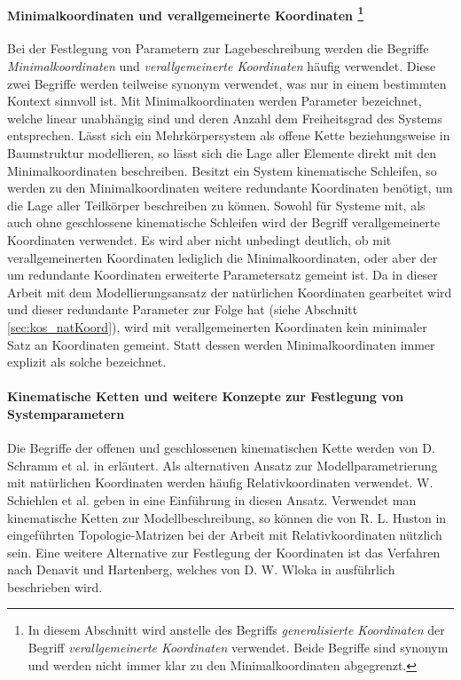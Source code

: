   \paragraph{Minimalkoordinaten und verallgemeinerte Koordinaten \footnote{In diesem Abschnitt wird anstelle des Begriffs \textit{generalisierte Koordinaten} der Begriff \textit{verallgemeinerte Koordinaten} verwendet. Beide Begriffe sind synonym und werden nicht immer klar zu den Minimalkoordinaten abgegrenzt.}}
  Bei der Festlegung von Parametern zur Lagebeschreibung werden die Begriffe \textit{Minimalkoordinaten} und \textit{verallgemeinerte Koordinaten} h\"aufig verwendet. Diese zwei Begriffe werden teilweise synonym verwendet, was nur in einem bestimmten Kontext sinnvoll ist. \hfill \newline
  Mit Minimalkoordinaten werden Parameter bezeichnet, welche linear unabh\"angig sind und deren Anzahl dem Freiheitsgrad des Systems entsprechen. L\"asst sich ein Mehrk\"orpersystem als offene Kette beziehungsweise in Baumstruktur modellieren, so l\"asst sich die Lage aller Elemente direkt mit den Minimalkoordinaten beschreiben. \cite[S.27 f.]{Bestle2012} Besitzt ein System kinematische Schleifen, so werden zu den Minimalkoordinaten weitere redundante Koordinaten ben\"otigt, um die Lage aller Teilk\"orper beschreiben zu k\"onnen. \cite[S.63]{Schramm2010} Sowohl f\"ur Systeme mit, als auch ohne geschlossene kinematische Schleifen wird der Begriff verallgemeinerte Koordinaten verwendet.  Es wird aber nicht unbedingt deutlich, ob mit verallgemeinerten Koordinaten lediglich die Minimalkoordinaten, oder aber der um redundante Koordinaten erweiterte Parametersatz gemeint ist. \cite[S.133]{Woernle2011} Da in dieser Arbeit mit dem Modellierungsansatz der nat\"urlichen Koordinaten gearbeitet wird und dieser redundante Parameter zur Folge hat (siehe Abschnitt \ref{sec:kos_natKoord}), wird mit verallgemeinerten Koordinaten kein minimaler Satz an Koordinaten gemeint. Statt dessen werden Minimalkoordinaten immer explizit als solche bezeichnet.
  \paragraph*{Kinematische Ketten und weitere Konzepte zur Festlegung von Systemparametern}
  Die Begriffe der offenen und geschlossenen kinematischen Kette werden von D. Schramm et al. in \cite[S. 52 ff.]{Schramm2010} erl\"autert. \hfill \newline
  Als alternativen Ansatz zur Modellparametrierung mit nat\"urlichen Koordinaten werden h\"aufig Relativkoordinaten verwendet. W. Schiehlen et al. geben in \cite{Schiehlen2014} eine Einf\"uhrung in diesen Ansatz. Verwendet man kinematische Ketten zur Modellbeschreibung, so k\"onnen die von R. L. Huston in \cite{Huston1986} eingef\"uhrten Topologie-Matrizen bei der Arbeit mit Relativkoordinaten n\"utzlich sein. Eine weitere Alternative zur Festlegung der Koordinaten ist das Verfahren nach Denavit und Hartenberg, welches von D. W. Wloka in \cite[S. 111 ff.]{Wloka1992} ausf\"uhrlich beschrieben wird.

